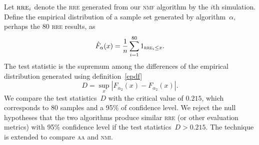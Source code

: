 Let $\textsc{rre}_i$ denote the \textsc{rre} generated from our \textsc{nmf} algorithm by the $i$th simulation. Define the empirical distribution of a sample set generated by algorithm~$\alpha$, perhaps the $80$ \textsc{rre} results, as
\begin{equation}\label{epdf}
  \hat{F}_{\alpha}(x)=\frac{1}{n}\sum_{i=1}^{80}1_{\textsc{rre}_i \leq x}.
\end{equation}
The test statistic is the supremum among the differences of the empirical distribution generated using definition~\eqref{epdf} \citep{Walck:1996cca}
\begin{equation}\label{teststatistic}
D=\sup _{x}\left|F_{\alpha_2}(x)-F_{\alpha_2}(x)\right|.
\end{equation}
We compare the test statistics~$D$ with the critical value of $0.215$, which corresponds to $80$ samples and a 95\% of confidence level. We reject the null hypotheses that the two algorithms produce similar \textsc{rre} (or other evaluation metrics) with 95\% confidence level if the test statistics~$D>0.215$. The technique is extended to compare \textsc{aa} and \textsc{nmi}.
